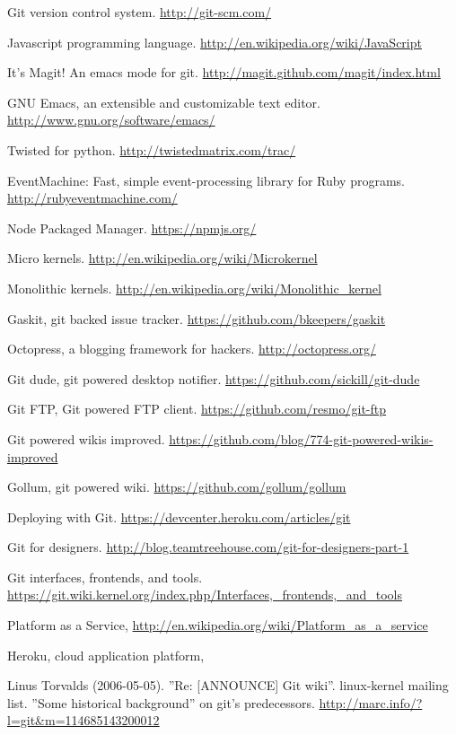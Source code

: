 \cleardoublepage
{}
{}
\begin{thebibliography}{99}

 Git version control system.
  \url{http://git-scm.com/}

 Javascript programming language.
  \url{http://en.wikipedia.org/wiki/JavaScript}

 It's Magit! An emacs mode for git.
  \url{http://magit.github.com/magit/index.html}

 GNU Emacs, an extensible and customizable text editor.
  \url{http://www.gnu.org/software/emacs/}

 Twisted for python.
  \url{http://twistedmatrix.com/trac/}

 EventMachine: Fast, simple event-processing library for
  Ruby programs. \url{http://rubyeventmachine.com/}

 Node Packaged Manager.
  \url{https://npmjs.org/}

 Micro kernels.
  \url{http://en.wikipedia.org/wiki/Microkernel}

 Monolithic kernels.
  \url{http://en.wikipedia.org/wiki/Monolithic_kernel}

 Gaskit, git backed issue tracker.
  \url{https://github.com/bkeepers/gaskit}

 Octopress, a blogging framework for hackers.
  \url{http://octopress.org/}

 Git dude, git powered desktop notifier.
  \url{https://github.com/sickill/git-dude}

 Git FTP, Git powered FTP client.
  \url{https://github.com/resmo/git-ftp}

 Git powered wikis improved.
  \url{https://github.com/blog/774-git-powered-wikis-improved}

 Gollum, git powered wiki.
  \url{https://github.com/gollum/gollum}

 Deploying with Git.
  \url{https://devcenter.heroku.com/articles/git}

 Git for designers.
  \url{http://blog.teamtreehouse.com/git-for-designers-part-1}

 Git interfaces, frontends, and tools.
  \url{https://git.wiki.kernel.org/index.php/Interfaces,_frontends,_and_tools}

 Platform as a Service,
  \url{http://en.wikipedia.org/wiki/Platform_as_a_service}

 Heroku, cloud application platform,


 Linus Torvalds (2006-05-05). ”Re: [ANNOUNCE] Git wiki”.
  linux-kernel mailing list. ”Some historical background” on git’s predecessors.
  \url{http://marc.info/?l=git\&m=114685143200012}


\end{thebibliography}

